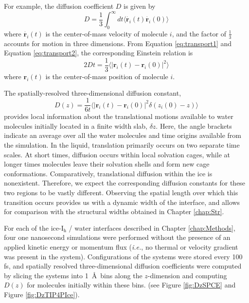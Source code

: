 For example, the diffusion coefficient $D$ is given by
\begin{equation}\label{eq:diffusion1}
D = \frac{1}{3} \int_0^{\infty} dt \langle \dot{\mathbf{r}_i}(t) 
\dot{\mathbf{r}_i}(0) \rangle
\end{equation}
where $\dot{\mathbf{r}_i}(t)$ is the center-of-mass velocity of molecule
$i$, and the factor of $\frac{1}{3}$ accounts for motion in three
dimensions. From Equation \eqref{eq:transport1} and Equation \eqref{eq:transport2},
the corresponding Einstein relation is
\begin{equation}\label{eq:diffusion2}
2Dt = \frac{1}{3} \langle | \mathbf{r}_i(t) - \mathbf{r}_i(0) |^2 \rangle
\end{equation}
where $\mathbf{r}_i(t)$ is the center-of-mass position of molecule
$i$. 

The spatially-resolved three-dimensional diffusion constant,
\begin{equation}\label{eq:diffusion3}
D(z) = \frac{1}{6t} \langle | \mathbf{r}_i(t) - \mathbf{r}_i(0) |^2
\delta(z_i(0) - z)  \rangle 
\end{equation}
provides local information about the translational motions available to
water molecules initially located in a finite width slab, $\delta
z$. Here, the angle brackets indicate an average over all the water
molecules and time origins available from the simulation. In the
liquid, translation primarily occurs on two separate time scales. At
short times, diffusion occurs within local solvation cages, while at
longer times molecules leave their solvation shells and form new cage
conformations. Comparatively, translational diffusion within the ice
is nonexistent. Therefore, we expect the corresponding diffusion
constants for these two regions to be vastly different. Observing the
spatial length over which this transition occurs provides us with a
dynamic width of the interface, and allows for comparison with the
structural widths obtained in Chapter \ref{chap:Str}.

For each of the ice-I$_\mathrm{h}$ / water interfaces described in
Chapter \ref{chap:Methods}, four one nanosecond simulations were
performed without the presence of an applied kinetic energy or
momentum flux (\textit{i.e.}, no thermal or velocity gradient was
present in the system). Configurations of the systems were stored
every 100 fs, and spatially resolved three-dimensional diffusion
coefficients were computed by slicing the systems into 1~\AA~bins
along the $z$-dimension and computing $D(z)$ for molecules initially
within these bins. (see Figure \ref{fig:DzSPCE} and Figure
\ref{fig:DzTIP4PIce}).

